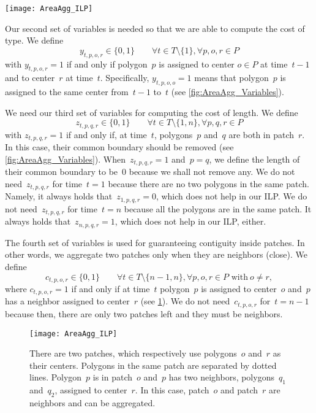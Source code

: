 \begin{figure*}[tb]
	\centering
	\texttt{[image: AreaAgg\_ILP]}
	\caption{Some examples of variables~$x_{t,p,r}$, 
		$y_{t,p,o,r}$, and~$z_{t,p,q,r}$. 
	}
	\label{fig:AreaAgg_Variables}
\end{figure*}


Our second set of variables is needed 
so that we are able to compute the cost of type.
We define 
$$
y_{t,p,o,r}\in \{0,1\} \qquad 
\forall t\in T\setminus \{1\}, \forall p,o,r \in P 
$$
with $y_{t,p,o,r}=1$ if and only if 
polygon~$p$ is assigned to center $o\in P$ at time~$t-1$ 
and to center~$r$ at time~$t$.
Specifically, $y_{t,p,o,o}=1$ means that
polygon~$p$ is assigned to the same center 
from~$t-1$ to~$t$ 
(see \fig\ref{fig:AreaAgg_Variables}).

We need our third set of variables 
for computing the cost of length.
We define 
$$
z_{t,p,q,r}\in \{0,1\} \qquad 
\forall t\in T\setminus \{1,n\}, \forall p,q,r \in P 
$$
with $z_{t,p,q,r}=1$ if and only if, at time~$t$,
polygons~$p$ and~$q$ are both in patch~$r$.
In this case, their common boundary should be removed
(see \fig\ref{fig:AreaAgg_Variables}).
When~$z_{t,p,q,r}=1$ and~$p=q$,
we define the length of their common boundary to be~$0$ 
because we shall not remove any.
We do not need~$z_{t,p,q,r}$ for time~$t=1$ 
because there are no two polygons in the same patch.
Namely, it always holds that~$z_{1,p,q,r}=0$, 
which does not help in our ILP.
We do not need~$z_{t,p,q,r}$ for time~$t=n$
because all the polygons are in the same patch.
It always holds that~$z_{n,p,q,r}=1$, 
which does not help in our ILP, either.

The fourth set of variables is used for 
guaranteeing contiguity inside patches. 
In other words, we aggregate two patches 
only when they are neighbors (close).
We define 
$$
c_{t,p,o,r}\in \{0,1\} \qquad 
\forall t\in T\setminus \{n-1,n\}, 
\forall p,o,r \in P \text{~with}~o\ne r,
$$
where $c_{t,p,o,r}=1$ if and only if at time~$t$
polygon~$p$ is assigned to center~$o$ 
and~$p$ has a neighbor assigned to center~$r$
(see \fig\ref{fig:AreaAgg_Variables_Neighbor}).
We do not need~$c_{t,p,o,r}$ for~$t=n-1$ 
because then, there are only two patches left 
and they must be neighbors.

\begin{figure}[tb]
	\centering
	\texttt{[image: AreaAgg\_ILP]}
	\caption{There are two patches, 
		which respectively use polygons~$o$ and~$r$ 
		as their centers.
		Polygons in the same patch 
		are separated by dotted lines.
		Polygon~$p$ is in patch~$o$ and~$p$ has two neighbors,
		polygons~$q_1$ and~$q_2$, assigned to center~$r$.
		In this case, patch~$o$ and patch~$r$ are neighbors 
		and can be aggregated. 
	}
	\label{fig:AreaAgg_Variables_Neighbor}
\end{figure} 

